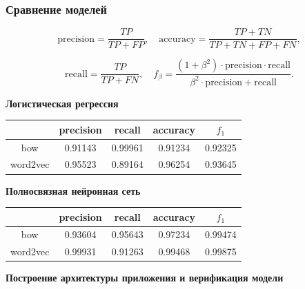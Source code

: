 \documentclass[compress,professionalfont]{beamer}
\begin{document}
\begin{frame}
\frametitle{Сравнение моделей}

$$
\text{precision} = \dfrac{TP}{TP + FP}, \quad \text{accuracy}= \dfrac{TP+TN}{TP+TN+FP+FN},
$$

$$
\text{recall} = \dfrac{TP}{TP + FN}, \quad f_{\beta} = \dfrac{(1 + \beta^2) \cdot \text{precision} \cdot \text{recall}}{\beta^2 \cdot \text{precision} + \text{recall}}.
$$

\begin{center}
\textbf{Логистическая регрессия}

  \begin{tabular}{ | c | c | c | c | c |}
    \hline
               & precision & recall & accuracy & $f_1$ \\ \hline
     bow       & 0.91143 & 0.99961 & 0.91234 & 0.92325 \\ \hline
     word2vec & 0.95523 & 0.89164 & 0.96254 & 0.93645 \\ \hline
  \end{tabular}

\vspace{.5cm}

\textbf{Полносвязная нейронная сеть}
  \begin{tabular}{ | c | c | c | c | c |}
    \hline
               & precision & recall & accuracy & $f_1$ \\ \hline
     bow       & 0.93604 & 0.95643 & 0.97234 & 0.99474 \\ \hline
     word2vec & 0.99931 & 0.91263 & 0.99468 & 0.99875 \\ \hline
  \end{tabular}
\end{center}

\end{frame}

\begin{frame}

\begin{center}
\Huge\bf Построение архитектуры приложения и верификация модели
\end{center}

\end{frame}
\end{document}
